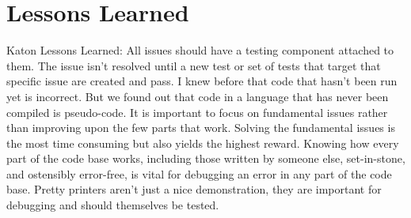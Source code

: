 \section{Lessons Learned}


Katon Lessons Learned:
All issues should have a testing component attached to them. The issue isn’t resolved until a new test or set of tests that target that specific issue are created and pass.
I knew before that code that hasn’t been run yet is incorrect. But we found out that code in a language that has never been compiled is pseudo-code.
It is important to focus on fundamental issues rather than improving upon the few parts that work. Solving the fundamental issues is the most time consuming but also yields the highest reward.
Knowing how every part of the code base works, including those written by someone else, set-in-stone, and ostensibly error-free, is vital for debugging an error in any part of the code base.
Pretty printers aren’t just a nice demonstration, they are important for debugging and should themselves be tested.	



